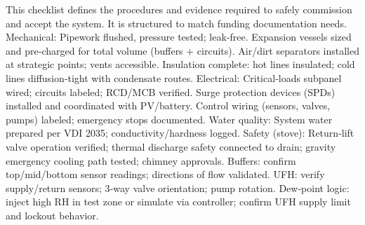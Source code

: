 \markdownRendererDocumentBegin
\markdownRendererSectionBegin
{}\markdownRendererInterblockSeparator
{}This checklist defines the procedures and evidence required to safely commission and accept the system. It is structured to match funding documentation needs.\markdownRendererInterblockSeparator
{}\markdownRendererSectionBegin
{}\markdownRendererInterblockSeparator
{}\markdownRendererUlBeginTight
\markdownRendererUlItem Mechanical:\markdownRendererUlItemEnd 
\markdownRendererUlItem Pipework flushed, pressure tested; leak‑free.\markdownRendererUlItemEnd 
\markdownRendererUlItem Expansion vessels sized and pre‑charged for total volume (buffers + circuits).\markdownRendererUlItemEnd 
\markdownRendererUlItem Air/dirt separators installed at strategic points; vents accessible.\markdownRendererUlItemEnd 
\markdownRendererUlItem Insulation complete: hot lines insulated; cold lines diffusion‑tight with condensate routes.\markdownRendererUlItemEnd 
\markdownRendererUlItem Electrical:\markdownRendererUlItemEnd 
\markdownRendererUlItem Critical‑loads subpanel wired; circuits labeled; RCD/MCB verified.\markdownRendererUlItemEnd 
\markdownRendererUlItem Surge protection devices (SPDs) installed and coordinated with PV/battery.\markdownRendererUlItemEnd 
\markdownRendererUlItem Control wiring (sensors, valves, pumps) labeled; emergency stops documented.\markdownRendererUlItemEnd 
\markdownRendererUlItem Water quality:\markdownRendererUlItemEnd 
\markdownRendererUlItem System water prepared per VDI 2035; conductivity/hardness logged.\markdownRendererUlItemEnd 
\markdownRendererUlItem Safety (stove):\markdownRendererUlItemEnd 
\markdownRendererUlItem Return‑lift valve operation verified; thermal discharge safety connected to drain; gravity emergency cooling path tested; chimney approvals.\markdownRendererUlItemEnd 
\markdownRendererUlEndTight \markdownRendererInterblockSeparator
{}
\markdownRendererSectionEnd \markdownRendererSectionBegin
{}\markdownRendererInterblockSeparator
{}\markdownRendererUlBeginTight
\markdownRendererUlItem Buffers: confirm top/mid/bottom sensor readings; directions of flow validated.\markdownRendererUlItemEnd 
\markdownRendererUlItem UFH: verify supply/return sensors; 3‑way valve orientation; pump rotation.\markdownRendererUlItemEnd 
\markdownRendererUlItem Dew‑point logic: inject high RH in test zone or simulate via controller; confirm UFH supply limit and lockout behavior.\markdownRendererUlItemEnd 
